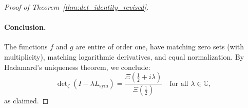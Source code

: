 \begin{proof}[Proof of Theorem~\ref{thm:det_identity_revised}]
\paragraph{Conclusion.}
The functions \( f \) and \( g \) are entire of order one, have matching zero sets (with multiplicity), matching logarithmic derivatives, and equal normalization. By Hadamard's uniqueness theorem, we conclude:
\[
\det\nolimits_\zeta(I - \lambda L_{\mathrm{sym}}) = \frac{\Xi\left( \tfrac{1}{2} + i\lambda \right)}{\Xi\left( \tfrac{1}{2} \right)}
\quad \text{for all } \lambda \in \mathbb{C},
\]
as claimed.
\end{proof}
% 